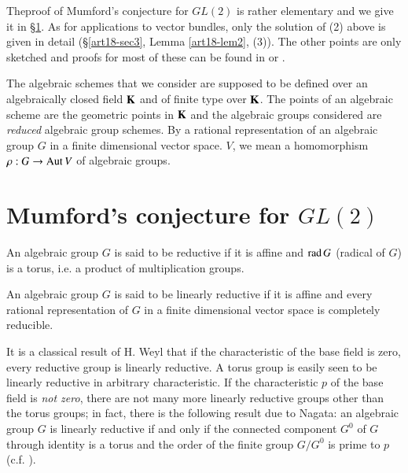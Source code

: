 The\pageoriginale proof of Mumford's conjecture for $GL(2)$ is rather elementary and we give it in \S\ref{art18-sec1}. As for applications to vector bundles, only the solution of (2) above is given in detail (\S\ref{art18-sec3}, Lemma \ref{art18-lem2}, (3)). The other points are only sketched and proofs for most of these can be found in \cite{art18-key5} or \cite{art18-key12}.

The algebraic schemes that we consider are supposed to be defined over an algebraically closed field $\mathbf{K}$ and of finite type over $\mathbf{K}$. The points of an algebraic scheme are the geometric points in $\mathbf{K}$ and the algebraic groups considered are {\em reduced} algebraic group schemes. By a rational representation of an algebraic group $G$ in a finite dimensional vector space. $V$, we mean a homomorphism $\rho:G\to \operatorname{\mathrm{Aut}} V$ of algebraic groups.

\section{Mumford's conjecture for $GL(2)$}\label{art18-sec1}

\begin{definition}\label{art18-defi1}
An algebraic group $G$ is said to be reductive if it is affine and $\operatorname{\mathrm{rad}} G$ (radical of $G$) is a torus, i.e. a product of multiplication groups.
\end{definition}

\begin{definition}\label{art18-defi2}
An algebraic group $G$ is said to be linearly reductive if it is affine and every rational representation of $G$ in a finite dimensional vector space is completely reducible.
\end{definition}

It is a classical result of H. Weyl that if the characteristic of the base field is zero, every reductive group is linearly reductive. A torus group is easily seen to be linearly reductive in arbitrary characteristic. If the characteristic $p$ of the base field is {\em not zero}, there are not many more linearly reductive groups other than the torus groups; in fact, there is the following result due to Nagata: an algebraic group $G$ is linearly reductive if and only if the connected component $G^{0}$ of $G$ through identity is a torus and the order of the finite group $G/G^{0}$ is prime to $p$ (c.f. \cite{art18-key6}).


